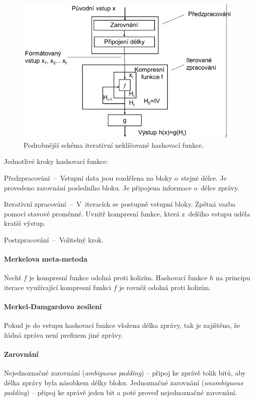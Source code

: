 \begin{figure}[H]
    \centering
    \includegraphics[width=0.9\linewidth]{hash_function_iterative_detail.pdf}
    \caption{Podrobnější schéma iterativní neklíčované hashovací funkce.}
\end{figure}

Jednotlivé kroky hashovací funkce: \begin{compactitem}
    \item Předzpracování~--~Vstupní data jsou rozdělena na bloky o~stejné délce. Je provedeno zarovnání posledního bloku. Je připojena informace o~délce zprávy.
    \item Iterativní zpracování~--~V~iteracích se postupně  vstupní bloky. Zpět\-ná vazba pomocí stavové proměnné. Uvnitř kompresní funkce, která z~delšího vstupu uděla kratší výstup.
    \item Postzpracování~--~Volitelný krok.
\end{compactitem}

\paragraph*{Merkelova meta-metoda} Nechť $f$ je kompresní funkce odolná proti kolizím. Hashovací funkce $h$ na principu iterace využívající kompresní funkci $f$ je rovněž odolná proti kolizím.

\paragraph*{Merkel-Damgardovo zesílení} Pokud je do vstupu hashovací funkce vložena délka zprá\-vy, tak je zajištěno, že žádná zpráva není prefixem jiné zprávy.

\paragraph*{Zarovnání} Nejednoznačné zarovnání (\textit{ambiguous padding}) -- připoj ke zprávě tolik bitů, aby délka zprávy byla násobkem délky bloku. Jednoznačné zarovnání (\textit{unambiguous padding}) -- připoj ke zprávě jeden bit a poté proveď nejednoznačné zarovnání.

